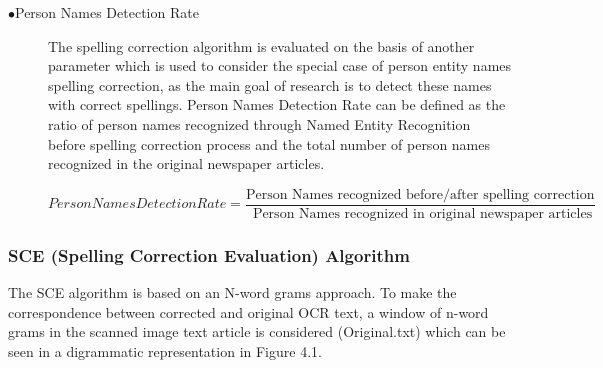 \documentclass[letterpaper,11pt]{report}
\begin{document}
\begin{description}
\item[$\bullet$Person Names Detection Rate]

The spelling correction algorithm is evaluated on the basis of another parameter which is used to consider the special case of person entity names spelling correction, as the main goal of research is to detect these names with correct spellings.
Person Names Detection Rate can be defined as the ratio of person names recognized through Named Entity Recognition before spelling correction process and the total number of person names recognized in the original newspaper articles.

$Person Names Detection Rate=\dfrac{ \text{Person Names recognized before/after spelling correction}} {\text{ Person Names recognized in original newspaper articles}} $

\end{description}

\subsubsection{SCE (Spelling Correction Evaluation) Algorithm}

The SCE algorithm is based on an N-word grams approach. To make the correspondence between corrected and original OCR text, a window of n-word grams in the scanned image text article is considered (Original.txt) which can be seen in a digrammatic representation in Figure 4.1.
\end{document}
